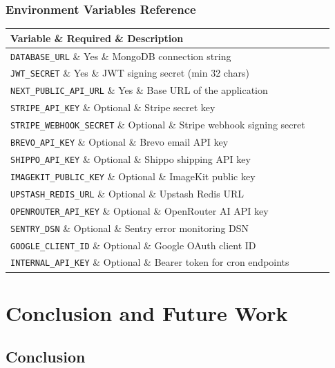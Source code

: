 ﻿\documentclass[12pt,a4paper]{report}
\begin{document}
\subsection{Environment Variables Reference}
\begin{center}
\begin{tabularx}{\textwidth}{llX}
  \toprule
  \textbf{Variable} \& \textbf{Required} \& \textbf{Description} \\
  \midrule
  \texttt{DATABASE\_URL} \& Yes \& MongoDB connection string \\
  \texttt{JWT\_SECRET} \& Yes \& JWT signing secret (min 32 chars) \\
  \texttt{NEXT\_PUBLIC\_API\_URL} \& Yes \& Base URL of the application \\
  \texttt{STRIPE\_API\_KEY} \& Optional \& Stripe secret key \\
  \texttt{STRIPE\_WEBHOOK\_SECRET} \& Optional \& Stripe webhook signing secret \\
  \texttt{BREVO\_API\_KEY} \& Optional \& Brevo email API key \\
  \texttt{SHIPPO\_API\_KEY} \& Optional \& Shippo shipping API key \\
  \texttt{IMAGEKIT\_PUBLIC\_KEY} \& Optional \& ImageKit public key \\
  \texttt{UPSTASH\_REDIS\_URL} \& Optional \& Upstash Redis URL \\
  \texttt{OPENROUTER\_API\_KEY} \& Optional \& OpenRouter AI API key \\
  \texttt{SENTRY\_DSN} \& Optional \& Sentry error monitoring DSN \\
  \texttt{GOOGLE\_CLIENT\_ID} \& Optional \& Google OAuth client ID \\
  \texttt{INTERNAL\_API\_KEY} \& Optional \& Bearer token for cron endpoints \\
  \bottomrule
\end{tabularx}
\end{center}

\chapter{Conclusion and Future Work}

\section{Conclusion}
\end{document}
